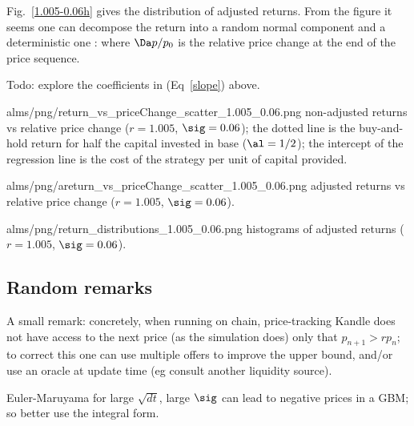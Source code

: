 \documentclass[oneside,10pt]{article}
\begin{document}
Fig.~\ref{1.005-0.06h} gives the distribution of adjusted returns. 
From the figure it seems one can decompose the return into a random normal component
and a deterministic one      :
where $\Da p/p_0$ is the relative price change at the end of the price sequence.

Todo: explore the coefficients in (Eq~\ref{slope}) above.

\IG{420pt}
{alms/png/return_vs_priceChange_scatter_1.005_0.06.png}
{\label{1.005-0.06r} non-adjusted returns vs relative price change ($r=1.005$, $\sig=0.06$); the dotted line is the buy-and-hold
return for half the capital invested in base ($\al=1/2$); the intercept of the regression line 
is the cost of the strategy per unit of capital provided.}

\IG{420pt}
{alms/png/areturn_vs_priceChange_scatter_1.005_0.06.png}
{\label{1.005-0.06ar} adjusted returns vs relative price change ($r=1.005$, $\sig=0.06$).}

\IG{420pt}
{alms/png/return_distributions_1.005_0.06.png}
{\label{1.005-0.06h} histograms of adjusted returns ($r=1.005$, $\sig=0.06$).}

\subsection{Random remarks}

A small remark: concretely, when running on chain, price-tracking Kandle does not have access to the next price (as the simulation does)
only that $p_{n+1}>r p_n$;
to correct this one can use multiple offers to improve the upper bound,
and/or use an oracle at update time (eg consult another liquidity source).

Euler-Maruyama for large $\sqrt{dt}$, large $\sig$ can lead to negative prices in a GBM;
so better use the integral form. 
\end{document}
